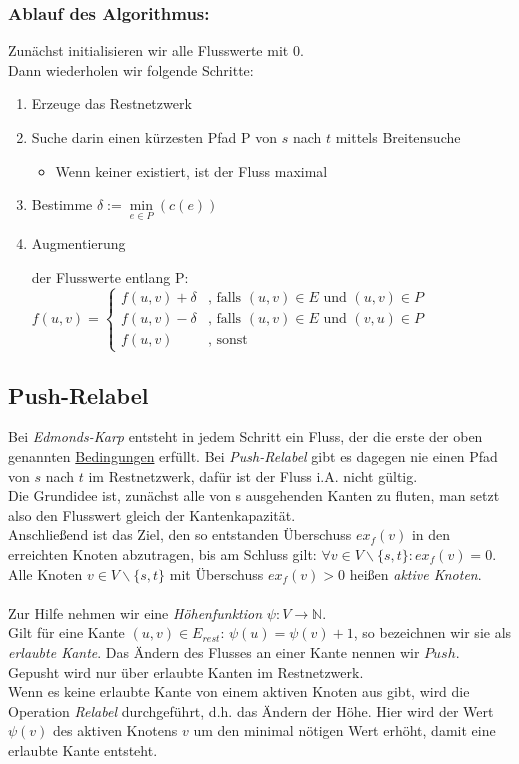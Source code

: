 \documentclass{llncs}
\begin{document}
\subsubsection{Ablauf des Algorithmus: }
Zunächst initialisieren wir alle Flusswerte mit 0.\\
Dann wiederholen wir folgende Schritte:\\
\begin{enumerate}
\item Erzeuge das Restnetzwerk 
\item Suche darin einen kürzesten Pfad P von $s$ nach $t$ mittels Breitensuche
\begin{itemize}
\item Wenn keiner existiert, ist der Fluss maximal
\end{itemize}
\item Bestimme $\delta := \min \limits_{e\in P}(c(e))$ 
\item \hypertarget{augLink}{Augmentierung} der Flusswerte entlang P: \\ 
$f(u,v) = \begin{cases}
f(u,v) + \delta & \text{, falls } (u,v)\in E\text{ und }(u,v)\in P\\
f(u,v) - \delta & \text{, falls } (u,v) \in E\text{ und }(v,u)\in P\\
f(u,v) & \text{, sonst}
\end{cases} $\\
\end{enumerate}

\subsection{Push-Relabel}

Bei \textit{Edmonds-Karp} entsteht in jedem Schritt ein Fluss, der die erste der oben genannten \hyperlink{bedLink}{Bedingungen} erfüllt. Bei \textit{Push-Relabel} gibt es dagegen nie einen Pfad von $s$ nach $t$ im Restnetzwerk, dafür ist der Fluss i.A. nicht gültig. \\
Die Grundidee ist, zunächst alle von s ausgehenden Kanten zu fluten, man setzt also den Flusswert gleich der Kantenkapazität. \\
Anschließend ist das Ziel, den so entstanden Überschuss $ex_f(v)$ in den erreichten Knoten abzutragen, bis am Schluss gilt: $\forall v \in V\backslash\{s, t\}: ex_f(v)=0$. \\
Alle Knoten $v \in V\backslash\{s, t\}$ mit Überschuss $ex_f(v)>0$ heißen \textit{aktive Knoten}.\\ \\
Zur Hilfe nehmen wir eine \textit{Höhenfunktion} $\psi : V \rightarrow \mathbb{N}$. \\
Gilt für eine Kante $(u,v)\in E_{rest}$: $\psi(u)=\psi(v)+1$, so bezeichnen wir sie als \textit{erlaubte Kante}. Das Ändern des Flusses an einer Kante nennen wir $Push$. Gepusht wird nur über erlaubte Kanten im Restnetzwerk. \\ 
Wenn es keine erlaubte Kante von einem aktiven Knoten aus gibt, wird die Operation \textit{Relabel} durchgeführt, d.h. das Ändern der Höhe. Hier wird der Wert $\psi(v)$ des aktiven Knotens $v$ um den minimal nötigen Wert erhöht, damit eine erlaubte Kante entsteht. 
\end{document}
